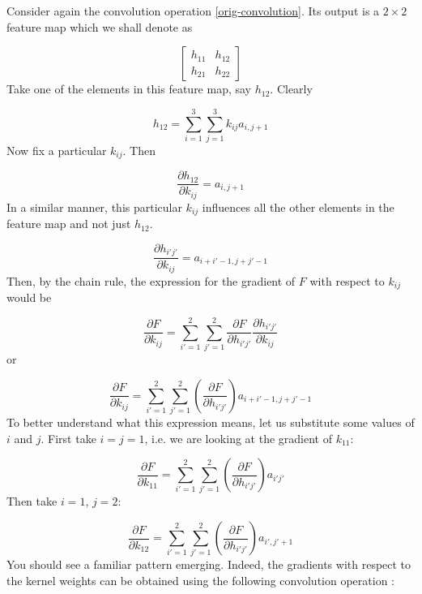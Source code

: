 \documentclass{article}[a4paper]
\begin{document}
Consider again the convolution operation \eqref{orig-convolution}. Its output is a $2 \times 2$ feature map which we shall denote as

\begin{equation*}
	\begin{bmatrix}
		h_{11} & h_{12} \\
		h_{21} & h_{22}
	\end{bmatrix}
\end{equation*}
Take one of the elements in this feature map, say $h_{12}$. Clearly

\begin{equation*}
	h_{12} = \sum_{i=1}^3 \sum_{j=1}^3 k_{ij} a_{i,j{+}1}
\end{equation*}
Now fix a particular $k_{ij}$. Then

\begin{equation*}
	\frac{\partial h_{12}}{\partial k_{ij}} = a_{i,j{+}1}
\end{equation*}
In a similar manner, this particular $k_{ij}$ influences all the other elements in the feature map and not just $h_{12}$. 

\begin{equation*}
	\frac{\partial h_{i'j'}}{\partial k_{ij}} = a_{i{+}i'{-}1, j{+}j'{-}1}
\end{equation*}
Then, by the chain rule, the expression for the gradient of $F$ with respect to $k_{ij}$ would be

\begin{equation*}
	\frac{\partial F}{\partial k_{ij}} = \sum_{i'=1}^2 \sum_{j'=1}^2 \frac{\partial F}{\partial h_{i'j'}} \frac{\partial h_{i'j'}}{\partial k_{ij}}
\end{equation*}
or

\begin{equation*}
	\frac{\partial F}{\partial k_{ij}} = \sum_{i'=1}^2 \sum_{j'=1}^2 \left( \frac{\partial F}{\partial h_{i'j'}} \right) a_{i{+}i'{-}1,j{+}j'{-}1}
\end{equation*}
To better understand what this expression means, let us substitute some values of $i$ and $j$. First take $i = j = 1$, i.e. we are looking at the gradient of $k_{11}$:

\begin{equation*}
	\frac{\partial F}{\partial k_{11}} = \sum_{i'=1}^2 \sum_{j'=1}^2 \left( \frac{\partial F}{\partial h_{i'j'}} \right) a_{i'j'}
\end{equation*}
Then take $i = 1$, $j = 2$:

\begin{equation*}
	\frac{\partial F}{\partial k_{12}} = \sum_{i'=1}^2 \sum_{j'=1}^2 \left( \frac{\partial F}{\partial h_{i'j'}} \right) a_{i',j'{+}1}
\end{equation*}
You should see a familiar pattern emerging. Indeed, the gradients with respect to the kernel weights can be obtained using the following convolution operation \cite{kafunah2016backpropagation}:
\end{document}
